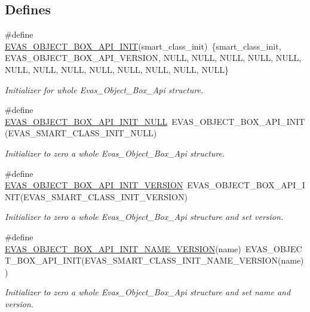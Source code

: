 \subsection*{Defines}
\begin{DoxyCompactItemize}
\item 
\#define \hyperlink{group__Evas__Object__Box_ga118b1b5bc278185207e7651911637ac8}{EVAS\_\-OBJECT\_\-BOX\_\-API\_\-INIT}(smart\_\-class\_\-init)~\{smart\_\-class\_\-init, EVAS\_\-OBJECT\_\-BOX\_\-API\_\-VERSION, NULL, NULL, NULL, NULL, NULL, NULL, NULL, NULL, NULL, NULL, NULL, NULL, NULL\}
\begin{DoxyCompactList}\small\item\em Initializer for whole Evas\_\-Object\_\-Box\_\-Api structure. \item\end{DoxyCompactList}\item 
\#define \hyperlink{group__Evas__Object__Box_gacfe469ef2fc811ab4af8c77105bf4baa}{EVAS\_\-OBJECT\_\-BOX\_\-API\_\-INIT\_\-NULL}~EVAS\_\-OBJECT\_\-BOX\_\-API\_\-INIT(EVAS\_\-SMART\_\-CLASS\_\-INIT\_\-NULL)
\begin{DoxyCompactList}\small\item\em Initializer to zero a whole Evas\_\-Object\_\-Box\_\-Api structure. \item\end{DoxyCompactList}\item 
\#define \hyperlink{group__Evas__Object__Box_gabab7b773ecb31ecbf661646d5db1bea1}{EVAS\_\-OBJECT\_\-BOX\_\-API\_\-INIT\_\-VERSION}~EVAS\_\-OBJECT\_\-BOX\_\-API\_\-INIT(EVAS\_\-SMART\_\-CLASS\_\-INIT\_\-VERSION)
\begin{DoxyCompactList}\small\item\em Initializer to zero a whole Evas\_\-Object\_\-Box\_\-Api structure and set version. \item\end{DoxyCompactList}\item 
\#define \hyperlink{group__Evas__Object__Box_gad35b8c6b395f976397abbb6f964878e7}{EVAS\_\-OBJECT\_\-BOX\_\-API\_\-INIT\_\-NAME\_\-VERSION}(name)~EVAS\_\-OBJECT\_\-BOX\_\-API\_\-INIT(EVAS\_\-SMART\_\-CLASS\_\-INIT\_\-NAME\_\-VERSION(name))
\begin{DoxyCompactList}\small\item\em Initializer to zero a whole Evas\_\-Object\_\-Box\_\-Api structure and set name and version. \item\end{DoxyCompactList}\end{DoxyCompactItemize}
